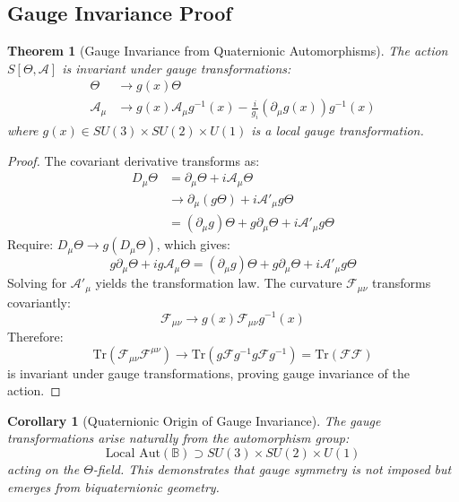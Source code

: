 \documentclass[12pt]{article}
\newtheorem{theorem}[definition]{Theorem}
\newtheorem{corollary}[definition]{Corollary}
\newcommand{\B}{\mathbb{B}}
\newcommand{\Aut}{\mathrm{Aut}}
\newcommand{\Tr}{\mathrm{Tr}}
\begin{document}
\subsection{Gauge Invariance Proof}

\begin{theorem}[Gauge Invariance from Quaternionic Automorphisms]
The action $S[\Theta, \mathcal{A}]$ is invariant under gauge transformations:
\begin{align}
\Theta &\to g(x) \Theta \\
\mathcal{A}_\mu &\to g(x) \mathcal{A}_\mu g^{-1}(x) - \frac{i}{g_i} (\partial_\mu g(x)) g^{-1}(x)
\end{align}
where $g(x) \in SU(3) \times SU(2) \times U(1)$ is a local gauge transformation.
\end{theorem}

\begin{proof}
The covariant derivative transforms as:
\begin{align}
D_\mu \Theta &= \partial_\mu \Theta + i\mathcal{A}_\mu \Theta \\
&\to \partial_\mu(g\Theta) + i\mathcal{A}'_\mu g\Theta \\
&= (\partial_\mu g)\Theta + g\partial_\mu\Theta + i\mathcal{A}'_\mu g\Theta
\end{align}
Require: $D_\mu\Theta \to g(D_\mu\Theta)$, which gives:
\begin{equation}
g\partial_\mu\Theta + ig\mathcal{A}_\mu\Theta = (\partial_\mu g)\Theta + g\partial_\mu\Theta + i\mathcal{A}'_\mu g\Theta
\end{equation}
Solving for $\mathcal{A}'_\mu$ yields the transformation law. The curvature $\mathcal{F}_{\mu\nu}$ transforms covariantly:
\begin{equation}
\mathcal{F}_{\mu\nu} \to g(x) \mathcal{F}_{\mu\nu} g^{-1}(x)
\end{equation}
Therefore:
\begin{equation}
\Tr(\mathcal{F}_{\mu\nu}\mathcal{F}^{\mu\nu}) \to \Tr(g\mathcal{F}g^{-1}g\mathcal{F}g^{-1}) = \Tr(\mathcal{F}\mathcal{F})
\end{equation}
is invariant under gauge transformations, proving gauge invariance of the action.
\end{proof}

\begin{corollary}[Quaternionic Origin of Gauge Invariance]
The gauge transformations arise naturally from the automorphism group:
\begin{equation}
\text{Local } \Aut(\B) \supset SU(3) \times SU(2) \times U(1)
\end{equation}
acting on the $\Theta$-field. This demonstrates that gauge symmetry is not imposed but emerges from biquaternionic geometry.
\end{corollary}
\end{document}
